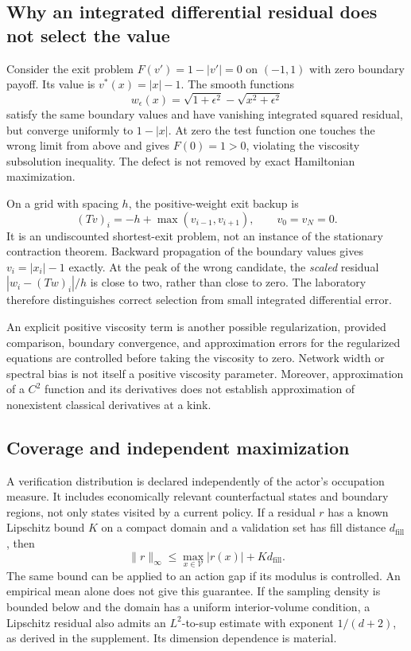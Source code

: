 \documentclass[ecta,draft]{econsocart}
\theoremstyle{definition}
\theoremstyle{remark}
\begin{document}
\subsection{Why an integrated differential residual does not select the value}
Consider the exit problem $F(v')=1-|v'|=0$ on $(-1,1)$ with zero boundary payoff. Its value is $v^*(x)=|x|-1$. The smooth functions
\[
 w_\epsilon(x)=\sqrt{1+\epsilon^2}-\sqrt{x^2+\epsilon^2}
\]
satisfy the same boundary values and have vanishing integrated squared residual, but converge uniformly to $1-|x|$. At zero the test function one touches the wrong limit from above and gives $F(0)=1>0$, violating the viscosity subsolution inequality. The defect is not removed by exact Hamiltonian maximization.

On a grid with spacing $h$, the positive-weight exit backup is
\begin{equation}\label{eq:exit}
 (Tv)_i=-h+\max(v_{i-1},v_{i+1}),\qquad v_0=v_N=0.
\end{equation}
It is an undiscounted shortest-exit problem, not an instance of the stationary contraction theorem. Backward propagation of the boundary values gives $v_i=|x_i|-1$ exactly. At the peak of the wrong candidate, the \emph{scaled} residual $|w_i-(Tw)_i|/h$ is close to two, rather than close to zero. The laboratory therefore distinguishes correct selection from small integrated differential error.

An explicit positive viscosity term is another possible regularization, provided comparison, boundary convergence, and approximation errors for the regularized equations are controlled before taking the viscosity to zero. Network width or spectral bias is not itself a positive viscosity parameter. Moreover, approximation of a $C^2$ function and its derivatives does not establish approximation of nonexistent classical derivatives at a kink.

\subsection{Coverage and independent maximization}\label{sec:coverage}
A verification distribution is declared independently of the actor's occupation measure. It includes economically relevant counterfactual states and boundary regions, not only states visited by a current policy. If a residual $r$ has a known Lipschitz bound $K$ on a compact domain and a validation set has fill distance $d_\mathrm{fill}$, then
\begin{equation}\label{eq:cover}
 \|r\|_\infty\leq\max_{x\in\mathcal V}|r(x)|+K d_\mathrm{fill}.
\end{equation}
The same bound can be applied to an action gap if its modulus is controlled. An empirical mean alone does not give this guarantee. If the sampling density is bounded below and the domain has a uniform interior-volume condition, a Lipschitz residual also admits an $L^2$-to-sup estimate with exponent $1/(d+2)$, as derived in the supplement. Its dimension dependence is material.
\end{document}
